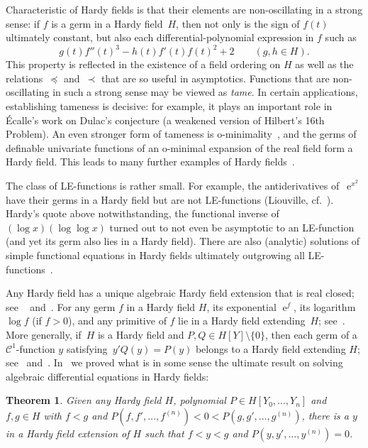 \documentclass[]{amsart}
\numberwithin{equation}{section}
\def \ex{\operatorname{e}}
\newtheorem*{theoremUnnumbered}{Theorem}
\theoremstyle{definition}
\theoremstyle{remark}
\renewcommand\preceq{\preccurlyeq}
\begin{document}
Characteristic of Hardy fields is that their elements are
non-oscillating in a strong sense: if $f$ is a germ in a Hardy field~$H$, then not only is the sign of $f(t)$   ultimately constant, but
also each differential-polynomial expression in $f$ such as 
$$g(t)f''(t)^3-h(t)f'(t)f(t)^2+2\qquad (g,h\in H).$$ This property is reflected in the existence of a field ordering
on $H$ as well as  the relations~$\preceq$ and~$\prec$ that are so useful in
asymptotics. 
Functions that are non-oscillating in such a strong sense may be viewed as {\it tame}\/. In certain
applications, establishing tameness   is   decisive: for example, it plays an important role in \'Ecalle's work \cite{Ecalle} on Dulac's conjecture
(a weakened version of Hilbert's 16th Problem). An even stronger form of tameness is o-minimality~\cite{Miller}, and the
germs of definable univariate functions of an o-minimal expansion of the real field   form
a Hardy field. This leads to many further examples of Hardy fields~\cite{KRS,RSW}. 

The class of LE-functions is rather small. For example, the antiderivatives of~$\ex^{x^2}$  have their germs in
 a Hardy field but are not LE-functions (Liouville,
 cf.~\cite{Rosenlicht72}). Hardy's quote   above notwithstanding, the functional inverse of~$(\log x)( \log \log x)$
turned out to not even be asymptotic to an LE-function~\cite{DMM1,vdH:PhD} (and yet its germ also lies in a Hardy field).
There are also (analytic) solutions of simple functional equations in Hardy fields ultimately outgrowing all LE-functions~\cite{Boshernitzan86}.

Any Hardy field has a unique algebraic Hardy field extension that is real closed; see ~\cite{Sj} and~\cite{Ro}. For any germ $f$ in a Hardy 
field $H$, its exponential $\ex^f$, its logarithm~$\log f$ (if $f >0$), and any primitive of $f$  
lie in a Hardy field extending~$H$; see~\cite{Bou}.  More generally, if~$H$ is a Hardy field and 
$P,Q\in H[Y]\setminus \{0\}$, then each germ of a $\mathcal C^1$-function $y$ satisfying~$y'Q(y)=P(y)$ belongs to a
Hardy field extending $H$; see~\cite[Theorem~2]{Ros} and~\cite{Singer}. 
In~\cite{ADH2} we proved what is in some sense the
ultimate result on solving algebraic differential equations in Hardy fields:

{\samepage
\begin{theoremUnnumbered}
Given any Hardy field $H$, polynomial $P\in H[Y_0,\dots,Y_n]$ and~$f,g \in H$ with $f<g$ and $P(f,f',\dots,f^{(n)})<0<P(g,g',\dots,g^{(n)})$,   there is a $y$ in a Hardy field extension of $H$
 such that $f<y<g$ and $P(y,y',\dots,y^{(n)})=0$.
\end{theoremUnnumbered}}
\end{document}
